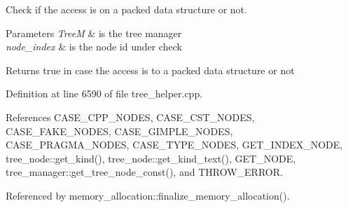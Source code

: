 Check if the access is on a packed data structure or not. 


\begin{DoxyParams}{Parameters}
{\em TreeM} & is the tree manager \\
\hline
{\em node\+\_\+index} & is the node id under check \\
\hline
\end{DoxyParams}
\begin{DoxyReturn}{Returns}
true in case the access is to a packed data structure or not 
\end{DoxyReturn}


Definition at line 6590 of file tree\+\_\+helper.\+cpp.



References C\+A\+S\+E\+\_\+\+C\+P\+P\+\_\+\+N\+O\+D\+ES, C\+A\+S\+E\+\_\+\+C\+S\+T\+\_\+\+N\+O\+D\+ES, C\+A\+S\+E\+\_\+\+F\+A\+K\+E\+\_\+\+N\+O\+D\+ES, C\+A\+S\+E\+\_\+\+G\+I\+M\+P\+L\+E\+\_\+\+N\+O\+D\+ES, C\+A\+S\+E\+\_\+\+P\+R\+A\+G\+M\+A\+\_\+\+N\+O\+D\+ES, C\+A\+S\+E\+\_\+\+T\+Y\+P\+E\+\_\+\+N\+O\+D\+ES, G\+E\+T\+\_\+\+I\+N\+D\+E\+X\+\_\+\+N\+O\+DE, tree\+\_\+node\+::get\+\_\+kind(), tree\+\_\+node\+::get\+\_\+kind\+\_\+text(), G\+E\+T\+\_\+\+N\+O\+DE, tree\+\_\+manager\+::get\+\_\+tree\+\_\+node\+\_\+const(), and T\+H\+R\+O\+W\+\_\+\+E\+R\+R\+OR.



Referenced by memory\+\_\+allocation\+::finalize\+\_\+memory\+\_\+allocation().

